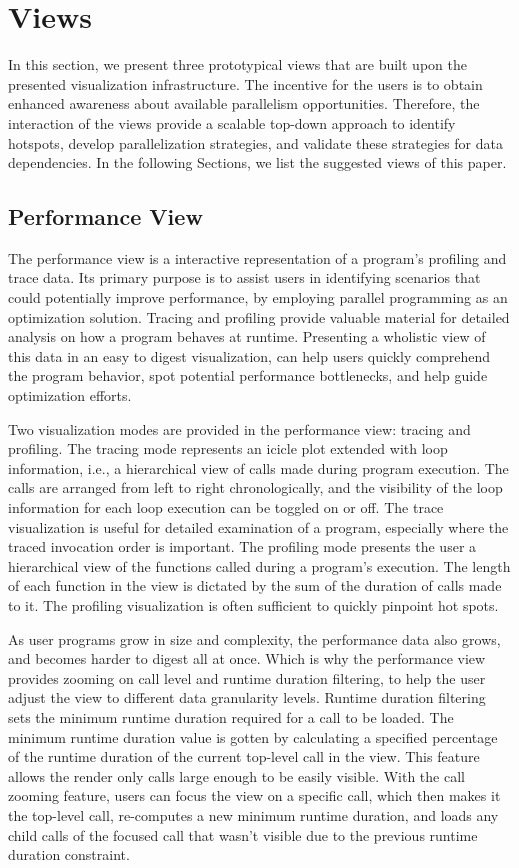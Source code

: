 \section{Views}
In this section, we present three prototypical views that are built upon the
presented visualization infrastructure. The incentive for the users is to
obtain enhanced awareness about available parallelism opportunities. Therefore,
the interaction of the views provide a scalable top-down approach to identify
hotspots, develop parallelization strategies, and validate these strategies for
data dependencies. In the following Sections, we list the suggested views of
this paper.

\subsection{Performance View}
\label{sec:performance_view}
The performance view is a interactive representation of a program's profiling
and trace data. Its primary purpose is to assist users in identifying scenarios
that could potentially improve performance, by employing parallel programming
as an optimization solution. Tracing and profiling provide valuable material
for detailed analysis on how a program behaves at runtime. Presenting a
wholistic view of this data in an easy to digest visualization, can help users
quickly comprehend the program behavior, spot potential performance
bottlenecks, and help guide optimization efforts.

Two visualization modes are provided in the performance view: tracing and
profiling. The tracing mode represents an icicle plot extended with loop
information, i.e., a hierarchical view of calls made during program execution.
The calls are arranged from left to right chronologically, and the visibility
of the loop information for each loop execution can be toggled on or off. The
trace visualization is useful for detailed examination of a program, especially
where the traced invocation order is important. The profiling mode presents the
user a hierarchical view of the functions called during a program's execution.
The length of each function in the view is dictated by the sum of the duration
of calls made to it. The profiling visualization is often sufficient to quickly
pinpoint hot spots.

As user programs grow in size and complexity, the performance data also grows,
and becomes harder to digest all at once. Which is why the performance view
provides zooming on call level and runtime duration filtering, to help the
user adjust the view to different data granularity levels. Runtime duration
filtering sets the minimum runtime duration required for a call to be loaded.
The minimum runtime duration value is gotten by calculating a specified
percentage of the runtime duration of the current top-level call in the view.
This feature allows the render only calls large enough to be easily visible.
With the call zooming feature, users can focus the view on a specific call,
which then makes it the top-level call, re-computes a new minimum runtime
duration, and loads any child calls of the focused call that wasn't visible due
to the previous runtime duration constraint.

